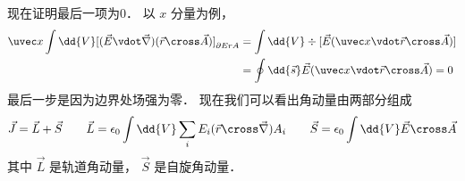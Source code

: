 现在证明最后一项为0． 以 $x$ 分量为例，
\begin{equation}
\begin{aligned}
\uvec x \int \dd{V} [(\vec E \vdot \vec\nabla )(\vec r \cross \vec A)]_{\partial ErA}  &= \int \dd{V} \div [\vec E(\uvec x \vdot \vec r \cross \vec A) ] \\
&= \oint \dd{\vec s} \vec E(\uvec x \vdot \vec r \cross \vec A)  = 0
\end{aligned}
\end{equation}
最后一步是因为边界处场强为零． 现在我们可以看出角动量由两部分组成
\begin{equation}
\vec J = \vec L + \vec S \qquad
\vec L = \epsilon_0 \int \dd{V} \sum_i E_i (\vec r \cross \vec\nabla ) A_i \qquad
\vec S = \epsilon_0 \int \dd{V} \vec E \cross \vec A
\end{equation}
其中 $\vec L$ 是轨道角动量， $\vec S$ 是自旋角动量．
